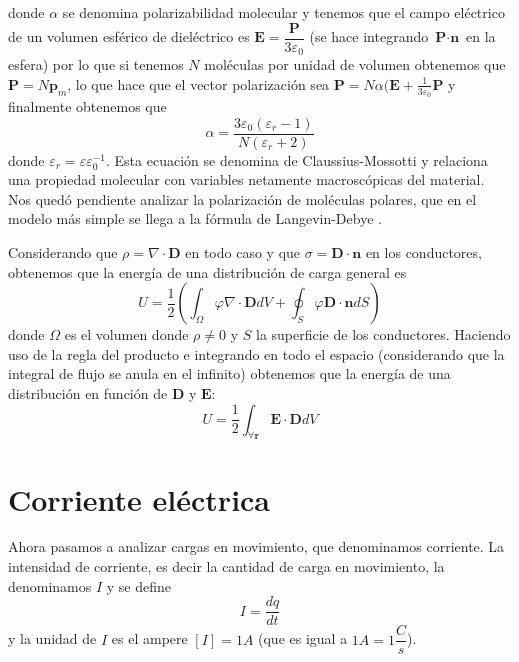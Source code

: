 \documentclass[11pt,a4paper]{article}
\numberwithin{equation}{section}
\begin{document}
    donde $\alpha$ se denomina polarizabilidad molecular y tenemos que el campo eléctrico de un volumen esférico de dieléctrico es $\textbf{E} = \dfrac{\textbf{P}}{3\varepsilon_0}$ (se hace integrando $\textbf{P}\cdot\textbf{n}$ en la esfera) por lo que si tenemos $N$ moléculas por unidad de volumen obtenemos que $\textbf{P} = N \textbf{p}_m$, lo que hace que el vector polarización sea $\textbf{P} = N \alpha(\textbf{E} + \frac{1}{3\varepsilon_0} \textbf{P}$ y finalmente obtenemos que
    \begin{equation}
        \alpha = \frac{3 \varepsilon_0 (\varepsilon_r - 1)}{N(\varepsilon_r +2)}
        \label{eq:e_claussius_mossotti}
    \end{equation}
    donde $\varepsilon_r = \varepsilon \varepsilon_0^{-1}$. Esta ecuación se denomina de Claussius-Mossotti y relaciona una propiedad molecular con variables netamente macroscópicas del material.
    Nos quedó pendiente analizar la polarización de moléculas polares, que en el modelo más simple se llega a la fórmula de Langevin-Debye \cite[p.~132]{reitz}. 
    
    Considerando que $\rho = \nabla \cdot \textbf{D}$ en todo caso y que $\sigma = \textbf{D} \cdot \textbf{n}$ en los conductores, obtenemos que la energía de una distribución de carga general es
    \begin{equation}
        U = \frac{1}{2} \left(\int_{\Omega} \varphi \nabla \cdot \textbf{D} dV + \oint_{S} \varphi \textbf{D} \cdot \textbf{n} dS\right)
        \label{eq:e_energia_general}
    \end{equation}
    donde $\Omega$ es el volumen donde $\rho \neq 0$ y $S$ la superficie de los conductores. Haciendo uso de la regla del producto e integrando en todo el espacio (considerando que la integral de flujo se anula en el infinito) obtenemos que la energía de una distribución en función de $\textbf{D}$ y $\textbf{E}$:
    \begin{equation}
        U = \frac{1}{2} \int_{\forall \textbf{r}} \textbf{E} \cdot \textbf{D} dV
        \label{eq:e_energia_general_campo}
    \end{equation}
\section{Corriente eléctrica}
\label{sec:corriente}
Ahora pasamos a analizar cargas en movimiento, que denominamos corriente. La intensidad de corriente, es decir la cantidad de carga en movimiento, la denominamos $I$ y se define
\begin{equation}
    I = \frac{dq}{dt}
    \label{eq:corriente_definicion}
\end{equation}
y la unidad de $I$ es el ampere $[I] = 1A$ (que es igual a $1A = 1\dfrac{C}{s}$). 
\end{document}
